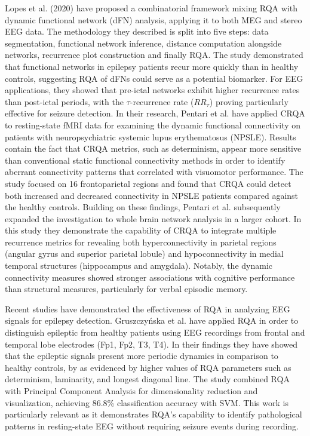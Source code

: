 \documentclass{article}
\begin{document}
Lopes et al. (2020)\cite{lopes} have proposed a combinatorial framework 
mixing RQA with dynamic functional network (dFN) analysis,
applying it to both MEG and stereo EEG data. 
The methodology they described is split into five steps: data segmentation, 
functional network inference, distance computation alongside networks, 
recurrence plot construction and finally RQA. 
The study demonstrated that functional networks in epilepsy 
patients recur more quickly than in healthy controls, suggesting RQA of 
dFNs could serve as a potential biomarker.
For EEG applications, they showed that pre-ictal networks exhibit higher recurrence rates 
than post-ictal periods, with the $\tau$-recurrence rate ($RR_{\tau}$) proving particularly 
effective for seizure detection.
In their research, Pentari et al.\cite{pentari22} have applied CRQA to resting-state fMRI data 
for examining the dynamic functional connectivity on patients with neuropsychiatric systemic 
lupus erythematosus (NPSLE). Results contain the fact that CRQA metrics, such as determinism,
appear more sensitive than conventional static functional connectivity methods in order to
identify aberrant connectivity patterns that correlated with visuomotor performance. 
The study focused on 16 frontoparietal regions and found that CRQA could detect 
both increased and decreased connectivity in NPSLE patients compared against the healthy controls. 
Building on these findings, Pentari et al.\cite{pentari23} subsequently expanded 
the investigation to whole brain network analysis in a larger cohort. 
In this study they demonstrate the capability of CRQA to integrate multiple recurrence metrics 
for revealing both hyperconnectivity in parietal regions (angular gyrus and superior parietal lobule) 
and hypoconnectivity in medial temporal structures (hippocampus and amygdala). 
Notably, the dynamic connectivity measures showed stronger associations with cognitive 
performance than structural measures, particularly for verbal episodic memory. 

Recent studies have demonstrated the effectiveness of RQA in 
analyzing EEG signals for epilepsy detection. 
Gruszczyńska et al.\cite{gruszczynska2019} have applied RQA
in order to distinguish epileptic from healthy patients using EEG recordings 
from frontal and temporal lobe electrodes (Fp1, Fp2, T3, T4). 
In their findings they have showed that the epileptic signals present more periodic
dynamics in comparison to healthy controls, by as evidenced by higher values of 
RQA parameters such as determinism,
laminarity, and longest diagonal line. The study combined RQA with
Principal Component Analysis for dimensionality reduction and visualization, achieving 86.8\% 
classification accuracy with SVM. This work is particularly relevant as it demonstrates RQA's capability
to identify pathological patterns in resting-state EEG without requiring seizure events during recording.
\end{document}
